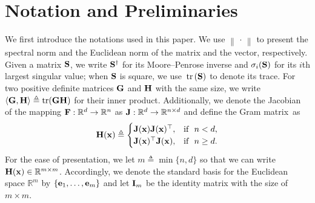\documentclass[11pt]{article}
\theoremstyle{plain}
\theoremstyle{definition}
\theoremstyle{remark}
\theoremstyle{plain}
\newcommand{\Norm}[1]{\left\| #1 \right\|}
\def\ve{{\bf{e}}}
\def\BR{{\mathbb{R}}}
\def\BR{{\mathbb{R}}}
\def\F{{\bf F}}
\def\G{{\bf G}}
\def\H{{\bf H}}
\def\I{{\bf I}}
\def \J{{\bf J}}
\def\S{{\bf S}}
\def\x{{\bf x}}
\def\RB{{\mathbb R}}
\def \tr #1{\text{\rm tr}\left(#1\right)}
\begin{document}


\section{Notation and Preliminaries} 
\label{sec:pre}

We first introduce the notations used in this paper. We use $\Norm{\,\cdot\,}$ to present the spectral norm and the Euclidean norm of the matrix and the vector, respectively. 
Given a matrix $\S$, we write $\S^{\dag}$ for its Moore--Penrose inverse and $\sigma_{i}(\S)$ for its $i$th largest singular value; when $\S$ is square, 
we use~$\tr{\S}$ to denote its trace.
For two positive definite matrices $\G$ and $\H$ with the same size, we write
$\langle\G,\H\rangle\triangleq\text{tr}(\G\H)$ for their inner product.
Additionally, we denote the Jacobian of the mapping $\F:\BR^d\to\BR^n$ as $\J:\BR^d\to\BR^{n\times d}$ and define the Gram matrix~as
\begin{align}\label{eq:H-Gram}
    \H(\x)\triangleq
\begin{cases}
\J(\x)\J(\x)^{\top}, & \text{if}~~n<d, \\    
\J(\x)^{\top}\J(\x), & \text{if}~~n\geq d.
\end{cases}
\end{align}
For the ease of presentation, we let $m\triangleq\min\{n,d\}$ so that we can write $\H(\x)\in\RB^{m\times m}$.
Accordingly, we denote the standard basis for the Euclidean space $\BR^m$ by $\{\ve_1,\dots,\ve_m\}$ and let $\I_{m}$ be the identity matrix with the size of $m\times m$.
\end{document}
